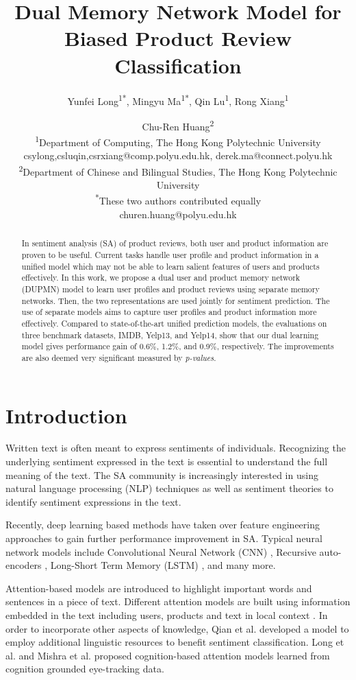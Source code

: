 \documentclass[11pt,a4paper]{article}
\title{Dual Memory Network Model for Biased Product Review Classification}
\author{Yunfei Long\textsuperscript{1}\textsuperscript{*}, Mingyu Ma\textsuperscript{1}\textsuperscript{*}, Qin Lu\textsuperscript{1}, Rong Xiang\textsuperscript{1} \and Chu-Ren Huang\textsuperscript{2}\\
  {\textsuperscript{1}Department of Computing, The Hong Kong Polytechnic University}\\
  {{csylong,csluqin,csrxiang}@comp.polyu.edu.hk, derek.ma@connect.polyu.hk}\\
  {\textsuperscript{2}Department of Chinese and Bilingual Studies, The Hong Kong Polytechnic University}\\
  {\textsuperscript{*}These two authors contributed equally}\\
  {churen.huang@polyu.edu.hk}}
\date{}
\begin{document}
\maketitle
\begin{abstract}
In sentiment analysis (SA) of product reviews, both user and product information are proven to be useful. Current tasks handle user profile and product information in a unified model which may not be able to learn salient features of users and products effectively.  In this work, we propose a dual user and product memory network (DUPMN) model to learn user profiles and product reviews using separate memory networks. Then, the two representations are used jointly for sentiment prediction. The use of separate models aims to capture user profiles and product information more effectively. Compared to state-of-the-art unified prediction models, the evaluations on three benchmark datasets, IMDB, Yelp13, and Yelp14, show that our dual learning model gives performance gain of 0.6\%, 1.2\%, and 0.9\%, respectively. The improvements are also deemed very significant measured by \textit{p-values}. 
\end{abstract}

\section{Introduction}
Written text is often meant to express sentiments of individuals. Recognizing the underlying sentiment expressed in the text is essential to understand the full meaning of the text. The SA community is increasingly interested in using natural language processing (NLP) techniques as well as sentiment theories to identify sentiment expressions in the text. 

Recently, deep learning based methods have taken over feature engineering approaches to gain further performance improvement in SA. Typical neural network models include Convolutional Neural Network (CNN) \cite{kim2014convolutional}, Recursive auto-encoders \cite{socher2013recursive}, Long-Short Term Memory (LSTM) \cite{tang2015document}, and many more. 

Attention-based models are introduced to highlight important words and sentences in a piece of text. Different attention models are built using information embedded in the text including users, products and text in local context \cite{tang2015learning,yang2016hierarchical,chen2016neural,gui2016intersubjectivity}. In order to incorporate other aspects of knowledge, Qian et al.  developed a model to employ additional linguistic resources to benefit sentiment classification. Long et al. and Mishra et al. proposed cognition-based attention models learned from cognition grounded eye-tracking data. 
\end{document}
